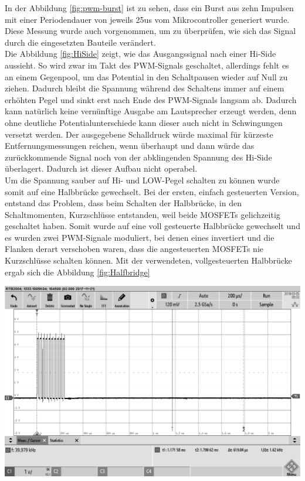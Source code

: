 In der Abbildung \ref{fig:pwm-burst} ist zu sehen, dass ein Burst aus zehn Impulsen mit einer Periodendauer von jeweils 25us vom Mikrocontroller generiert wurde. Diese Messung wurde auch vorgenommen, um zu überprüfen, wie sich das Signal durch die eingesetzten Bauteile verändert.\\
Die Abbildung \ref{fig:HiSide} zeigt, wie das Ausgangssignal nach einer Hi-Side aussieht. So wird zwar im Takt des PWM-Signals geschaltet, allerdings fehlt es an einem Gegenpool, um das Potential in den Schaltpausen wieder auf Null zu ziehen. Dadurch bleibt die Spannung während des Schaltens immer auf einem erhöhten Pegel und sinkt erst nach Ende des PWM-Signals langsam ab. Dadurch kann natürlich keine vernünftige Ausgabe am Lautsprecher erzeugt werden, denn ohne deutliche Potentialunterschiede kann dieser auch nicht in Schwingungen versetzt werden. Der ausgegebene Schalldruck würde maximal für kürzeste Entfernungsmessungen reichen, wenn überhaupt und dann würde das zurückkommende Signal noch von der abklingenden Spannung des Hi-Side überlagert. Dadurch ist dieser Aufbau nicht operabel.\\Um die Spannung sauber auf Hi- und LOW-Pegel schalten zu können wurde somit auf eine Halbbrücke gewechselt. Bei der ersten, einfach gesteuerten Version, entstand das Problem, dass beim Schalten der Halbbrücke, in den Schaltmomenten, Kurzschlüsse entstanden, weil beide MOSFETs gelichzeitig geschaltet haben. Somit wurde auf eine voll gesteuerte Halbbrücke gewechselt und es wurden zwei PWM-Signale moduliert, bei denen eines invertiert und die Flanken derart verschoben waren, dass die angesteuerten MOSFETs nie Kurzschlüsse schalten können. Mit der verwendeten, vollgesteuerten Halbbrücke ergab sich die Abbildung \ref{fig:Halfbridge}\\
\begin{minipage}{0.5\textwidth}
\includegraphics[width=1\textwidth%
]{Abbildungen/MessungenP1/PWM-Nach-der-Halbbrucke.png}
\label{fig:Halfbridge}
\end{minipage}
